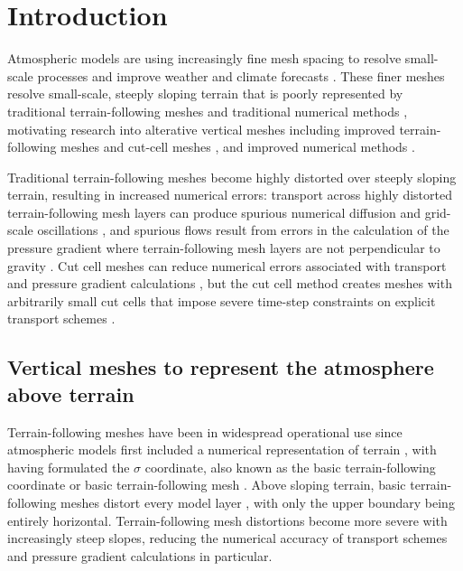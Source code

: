 \chapter{Introduction}

Atmospheric models are using increasingly fine mesh spacing to resolve small-scale processes and improve weather and climate forecasts \citep{wedi2014}.
These finer meshes resolve small-scale, steeply sloping terrain that is poorly represented by traditional terrain-following meshes and traditional numerical methods \citep{schaer2002}, motivating research into alterative vertical meshes including improved terrain-following meshes \citep{schaer2002,klemp2011} and cut-cell meshes \citep{jaehn2015,yamazaki2016}, and improved numerical methods \citep{zaengl2012,steppeler-klemp2017}.

Traditional terrain-following meshes become highly distorted over steeply sloping terrain, resulting in increased numerical errors: transport across highly distorted terrain-following mesh layers can produce spurious numerical diffusion and grid-scale oscillations \citep{hoinka-zaengl2004,schaer2002}, and spurious flows result from errors in the calculation of the pressure gradient where terrain-following mesh layers are not perpendicular to gravity \citep{klemp2011,zaengl2012}.
Cut cell meshes can reduce numerical errors associated with transport and pressure gradient calculations \citep{good2014}, but the cut cell method creates meshes with arbitrarily small cut cells that impose severe time-step constraints on explicit transport schemes \citep{klein2009}.

\section{Vertical meshes to represent the atmosphere above terrain}

Terrain-following meshes have been in widespread operational use since atmospheric models first included a numerical representation of terrain \citep{steppeler2003}, with \citet{phillips1957} having formulated the $\sigma$ coordinate, also known as the basic terrain-following coordinate or basic terrain-following mesh \citep{galchen-somerville1975a}.
Above sloping terrain, basic terrain-following meshes distort every model layer , with only the upper boundary being entirely horizontal.
Terrain-following mesh distortions become more severe with increasingly steep slopes, reducing the numerical accuracy of transport schemes and pressure gradient calculations in particular.

